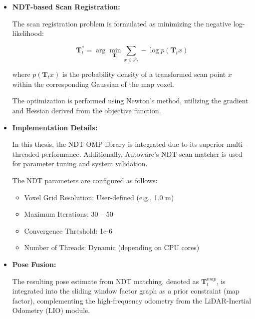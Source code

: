 \begin{itemize}
	
	\item \textbf{NDT-based Scan Registration:}
	
	
	The scan registration problem is formulated as minimizing the negative log-likelihood:
	
	\begin{equation}
		\mathbf{T}_t^* = \arg\min_{\mathbf{T}_t} \sum_{x \in \mathcal{P}_t} - \log p( \mathbf{T}_t x )
	\end{equation}
	
	where $p( \mathbf{T}_t x )$ is the probability density of a transformed scan point $x$ within the corresponding Gaussian of the map voxel.
	
	The optimization is performed using Newton’s method, utilizing the gradient and Hessian derived from the objective function.
	
	\item \textbf{Implementation Details:}
	
	In this thesis, the NDT-OMP library \cite{koide2019portable} is integrated due to its superior multi-threaded performance. Additionally, Autoware's NDT scan matcher \cite{autoware_ndt} is used for parameter tuning and system validation.
	
	The NDT parameters are configured as follows:
	\begin{itemize}
		\item Voxel Grid Resolution: User-defined (e.g., 1.0 m)
		\item Maximum Iterations: 30 -- 50
		\item Convergence Threshold: 1e-6
		\item Number of Threads: Dynamic (depending on CPU cores)
	\end{itemize}
	
	\item \textbf{Pose Fusion:}
	
	The resulting pose estimate from NDT matching, denoted as $\mathbf{T}_t^{map}$, is integrated into the sliding window factor graph as a prior constraint (map factor), complementing the high-frequency odometry from the LiDAR-Inertial Odometry (LIO) module.
	
\end{itemize}




